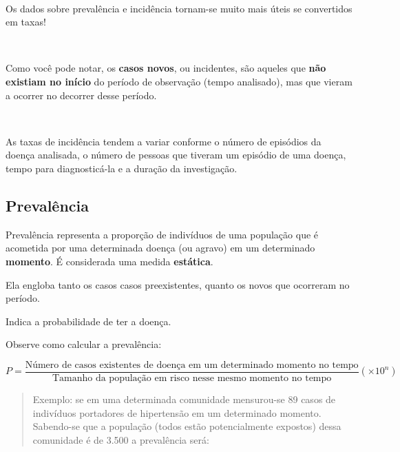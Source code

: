 \documentclass[
]{book}
\begin{document}
~

Os dados sobre prevalência e incidência tornam-se muito mais úteis se convertidos em taxas!

~

Como você pode notar, os \textbf{casos novos}, ou incidentes, são aqueles que \textbf{não existiam no início} do período de observação (tempo analisado), mas que vieram a ocorrer no decorrer desse período.

~

As taxas de incidência tendem a variar conforme o número de episódios da doença analisada, o número de pessoas que tiveram um episódio de uma doença, tempo para diagnosticá-la e a duração da investigação.

\hfill\break

\hypertarget{prevaluxeancia}{%
\subsection{Prevalência}\label{prevaluxeancia}}

\hfill\break

Prevalência representa a proporção de indivíduos de uma população que é acometida por uma determinada doença (ou agravo) em um determinado \textbf{momento}. É considerada uma medida \textbf{estática}.

\hfill\break

Ela engloba tanto os casos casos preexistentes, quanto os novos que ocorreram no período.

\hfill\break

Indica a probabilidade de ter a doença.

\hfill\break

Observe como calcular a prevalência:

\hfill\break

\[
P=\frac{\text{Número de  casos existentes de doença em um determinado momento no tempo}}{\text{Tamanho da população em risco nesse mesmo momento no tempo}} (\times 10^{n})
\]

\hfill\break

\begin{quote}
Exemplo: se em uma determinada comunidade mensurou-se 89 casos de indivíduos portadores de hipertensão em um determinado momento. Sabendo-se que a população (todos estão potencialmente expostos) dessa comunidade é de 3.500 a prevalência será:
\end{quote}

\hfill\break
\end{document}
